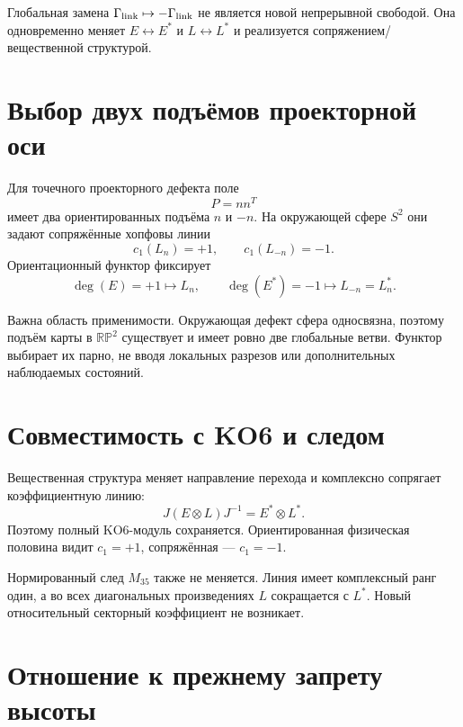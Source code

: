 Глобальная замена $\Gamma_{\rm link}\mapsto-\Gamma_{\rm link}$ не является
новой непрерывной свободой. Она одновременно меняет $E\leftrightarrow E^*$
и $L\leftrightarrow L^*$ и реализуется сопряжением/вещественной структурой.

\section{Выбор двух подъёмов проекторной оси}

Для точечного проекторного дефекта поле
\begin{equation}
 P=nn^T
\end{equation}
имеет два ориентированных подъёма $n$ и $-n$. На окружающей сфере $S^2$
они задают сопряжённые хопфовы линии
\begin{equation}
 c_1(L_n)=+1,
 \qquad
 c_1(L_{-n})=-1.
\end{equation}
Ориентационный функтор фиксирует
\begin{equation}
 \deg(E)=+1\longmapsto L_n,
 \qquad
 \deg(E^*)=-1\longmapsto L_{-n}=L_n^*.
 \label{eq:v5-hopf-arrow-lift-selection}
\end{equation}

Важна область применимости. Окружающая дефект сфера односвязна, поэтому
подъём карты в $\mathbb{RP}^2$ существует и имеет ровно две глобальные
ветви. Функтор выбирает их парно, не вводя локальных разрезов или
дополнительных наблюдаемых состояний.

\section{Совместимость с KO6 и следом}

Вещественная структура меняет направление перехода и комплексно
сопрягает коэффициентную линию:
\begin{equation}
 J(E\otimes L)J^{-1}=E^*\otimes L^*.
 \label{eq:v5-hopf-J-oriented-pair}
\end{equation}
Поэтому полный KO6-модуль сохраняется. Ориентированная физическая половина
видит $c_1=+1$, сопряжённая --- $c_1=-1$.

Нормированный след $M_{35}$ также не меняется. Линия имеет комплексный
ранг один, а во всех диагональных произведениях $L$ сокращается с $L^*$.
Новый относительный секторный коэффициент не возникает.

\section{Отношение к прежнему запрету высоты}


